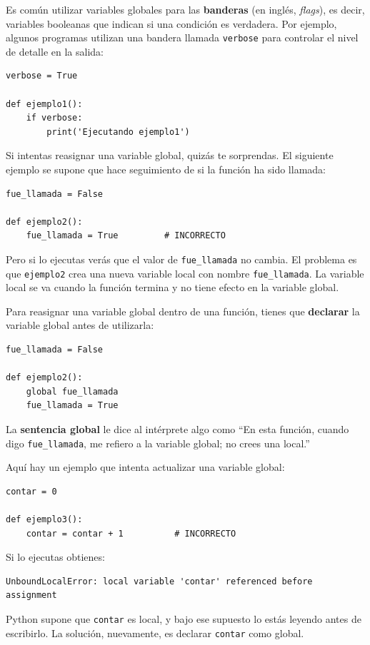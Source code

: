 \documentclass[10pt]{book}
\begin{document}
Es común utilizar variables globales para las {\bf banderas} (en inglés, {\em flags}), es decir,
variables booleanas que indican si una condición
es verdadera.  Por ejemplo, algunos programas utilizan
una bandera llamada {\tt verbose} para controlar el nivel de detalle en la
salida:

\begin{verbatim}
verbose = True

def ejemplo1():
    if verbose:
        print('Ejecutando ejemplo1')
\end{verbatim}
%
Si intentas reasignar una variable global, quizás te sorprendas.
El siguiente ejemplo se supone que hace seguimiento de si la
función ha sido llamada:

\begin{verbatim}
fue_llamada = False

def ejemplo2():
    fue_llamada = True         # INCORRECTO 
\end{verbatim} 
% 
Pero si lo ejecutas verás que el valor de \verb"fue_llamada"
no cambia. El problema es que {\tt ejemplo2} crea una nueva variable local
con nombre \verb"fue_llamada".  La variable local se va cuando 
la función termina y no tiene efecto en la variable global.

Para reasignar una variable global dentro de una función, tienes que
{\bf declarar} la variable global antes de utilizarla:

\begin{verbatim}
fue_llamada = False

def ejemplo2():
    global fue_llamada
    fue_llamada = True
\end{verbatim}
%
La {\bf sentencia global} le dice al intérprete
algo como ``En esta función, cuando digo \verb"fue_llamada",
me refiero a la variable global; no crees una local.''

Aquí hay un ejemplo que intenta actualizar una variable global:

\begin{verbatim}
contar = 0

def ejemplo3():
    contar = contar + 1          # INCORRECTO
\end{verbatim}
%
Si lo ejecutas obtienes:

\begin{verbatim}
UnboundLocalError: local variable 'contar' referenced before assignment
\end{verbatim}
%
Python supone que {\tt contar} es local, y bajo ese supuesto
lo estás leyendo antes de escribirlo.  La solución, nuevamente,
es declarar {\tt contar} como global.
\end{document}
